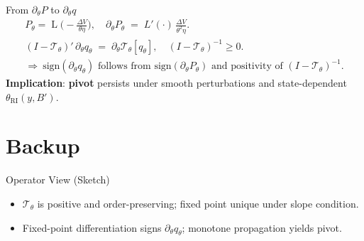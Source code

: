 \documentclass[aspectratio=169,11pt,professionalfonts]{beamer}
\newcommand{\1}{\mathbb{1}}
\DeclareMathOperator{\Lsig}{L}
\begin{document}
\begin{frame}{From $\partial_\theta P$ to $\partial_\theta q$}
  \begin{gather*}
    P_\theta=\Lsig\!\Big(-\tfrac{\Delta V}{\theta\eta}\Big),\quad \partial_\theta P_\theta\;=\;L'(\cdot)\,\tfrac{\Delta V}{\theta^2\eta}.\\
    (I-\mathcal T_\theta)'\,\partial_\theta q_\theta\;=\;\partial_\theta \mathcal T_\theta[q_\theta],\quad (I-\mathcal T_\theta)^{-1}\ge0.\\
    \Rightarrow\ \mathrm{sign}(\partial_\theta q_\theta) \text{ follows from } \mathrm{sign}(\partial_\theta P_\theta) \text{ and positivity of }(I{-}\mathcal T_\theta)^{-1}.
  \end{gather*}
  \textbf{Implication}: \textbf{pivot} persists under smooth perturbations and state-dependent $\theta_{\mathrm{RI}}(y,B')$.
\end{frame}

\appendix
\section{Backup}

\begin{frame}{Operator View (Sketch)}
  \begin{itemize}
    \item $\mathcal T_\theta$ is positive and order-preserving; fixed point unique under slope condition.
    \item Fixed-point differentiation signs $\partial_\theta q_\theta$; monotone
          propagation yields pivot.
  \end{itemize}
\end{frame}
\end{document}
